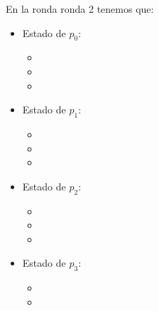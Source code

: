 En la ronda ronda 2 tenemos que:

\begin{multicols}{2}
\begin{itemize}
\item Estado de $p_0$:
      \begin{itemize}
      \item {}
      
      \item {}
      
      \item {}
      \end{itemize}
      
\item Estado de $p_1$:
      \begin{itemize}
      \item {}
      
      \item {}
      
      \item {}
      \end{itemize}

\item Estado de $p_2$:
      \begin{itemize}
      \item {}
      
      \item {}
      
      \item {}
      \end{itemize}

\item Estado de $p_3$:
      \begin{itemize}
      \item {}
      
      \item {}
      

\end{itemize}
\end{itemize}
\end{multicols}
